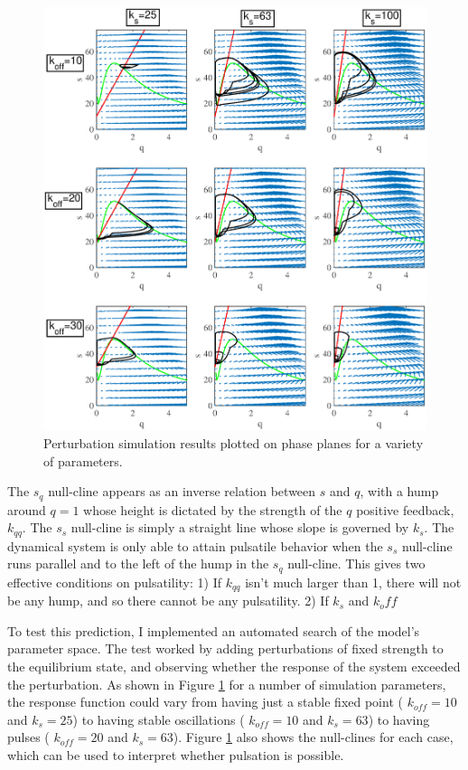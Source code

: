 \begin{figure}[h!]
	\centering
	\includegraphics[width=\hsize]{pulse/phase_tester.eps}
	\caption{\label{fig:pulse_test}  Perturbation simulation results plotted on phase planes for a variety of parameters.  }
\end{figure}

The $s_q$ null-cline appears as an inverse relation between $s$ and $q$, with a hump around $q=1$ whose height is dictated by the strength of the $q$ positive feedback, $k_{qq}$.  The $s_s$ null-cline is simply a straight line whose slope is governed by $k_s$.  The dynamical system is only able to attain pulsatile behavior when the $s_s$ null-cline runs parallel and to the left of the hump in the $s_q$ null-cline.  This gives two effective conditions on pulsatility: 1) If $k_{qq}$ isn't much larger than 1, there will not be any hump, and so there cannot be any pulsatility. 2) If $k_s$ and $k_off$

To test this prediction, I implemented an automated search of the model's parameter space.  The test worked by adding perturbations of fixed strength to the equilibrium state, and observing whether the response of the system exceeded the perturbation. As shown in Figure \ref{fig:pulse_test} for a number of simulation parameters, the response function could vary from having just a stable fixed point ( $k_{off}=10$ and $k_s=25$) to having stable oscillations ( $k_{off}=10$ and $k_s=63$) to having pulses ( $k_{off}=20$ and $k_s=63$).  Figure \ref{fig:pulse_test} also shows the null-clines for each case, which can be used to interpret whether pulsation is possible.

